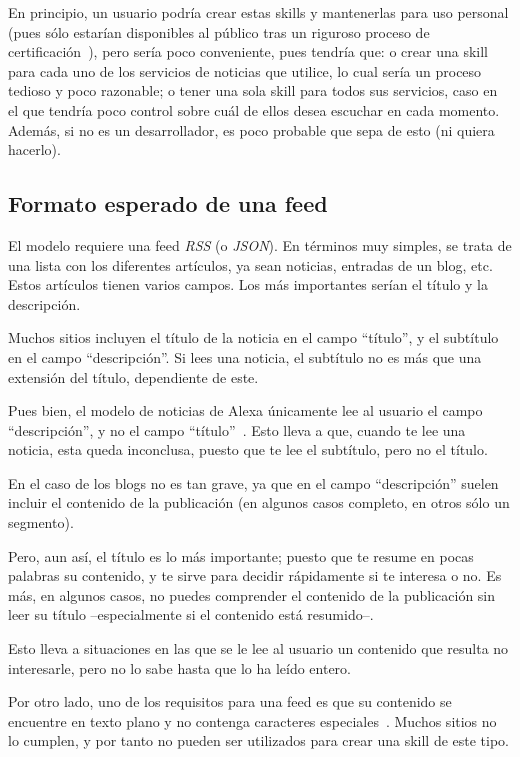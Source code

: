 \documentclass[11pt,spanish,listoffigures,listoftables,table,hyphens,dvipsnames]{tfgetsinf}
\begin{document}
En principio, un usuario podría crear estas skills y mantenerlas para uso personal (pues sólo estarían disponibles al público tras un riguroso proceso de certificación~\cite{flash-briefing-skill-certification-process}), pero sería poco conveniente, pues tendría que: o crear una skill para cada uno de los servicios de noticias que utilice, lo cual sería un proceso tedioso y poco razonable; o tener una sola skill para todos sus servicios, caso en el que tendría poco control sobre cuál de ellos desea escuchar en cada momento. Además, si no es un desarrollador, es poco probable que sepa de esto (ni quiera hacerlo).

\subsection{Formato esperado de una feed}

El modelo requiere una feed \textit{RSS} (o \textit{JSON}). En términos muy simples, se trata de una lista con los diferentes artículos, ya sean noticias, entradas de un blog, etc. Estos artículos tienen varios campos. Los más importantes serían el título y la descripción.
   
Muchos sitios incluyen el título de la noticia en el campo ``título'', y el subtítulo en el campo ``descripción''. Si lees una noticia, el subtítulo no es más que una extensión del título, dependiente de este.

Pues bien, el modelo de noticias de Alexa únicamente lee al usuario el campo ``descripción'', y no el campo ``título''~\cite{flash-briefing-skill-feed-format-details}. Esto lleva a que, cuando te lee una noticia, esta queda inconclusa, puesto que te lee el subtítulo, pero no el título.
   
En el caso de los blogs no es tan grave, ya que en el campo ``descripción'' suelen incluir el contenido de la publicación (en algunos casos completo, en otros sólo un segmento). 

Pero, aun así, el título es lo más importante; puesto que te resume en pocas palabras su contenido, y te sirve para decidir rápidamente si te interesa o no. Es más, en algunos casos, no puedes comprender el contenido de la publicación sin leer su título --especialmente si el contenido está resumido--.

Esto lleva a situaciones en las que se le lee al usuario un contenido que resulta no interesarle, pero no lo sabe hasta que lo ha leído entero.

Por otro lado, uno de los requisitos para una feed es que su contenido se encuentre en texto plano y no contenga caracteres especiales~\cite{flash-briefing-skill-text-content-requirements}. Muchos sitios no lo cumplen, y por tanto no pueden ser utilizados para crear una skill de este tipo.
\end{document}
